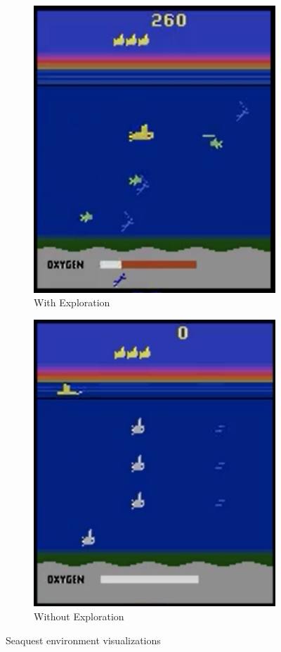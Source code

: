 \documentclass{article}
\begin{document}
\begin{figure}
\centering
\begin{subfigure}{.5\textwidth}
  \centering
  \includegraphics[width=.7\linewidth]{figures/seaquest}
  \caption{With Exploration}
\end{subfigure}%
\begin{subfigure}{.5\textwidth}
  \centering
  \includegraphics[width=.7\linewidth]{figures/seaquest_no_exp}
  \caption{Without Exploration}
\end{subfigure}
\caption{Seaquest environment visualizations}
\label{fig:seaquest}
\end{figure}
\end{document}

